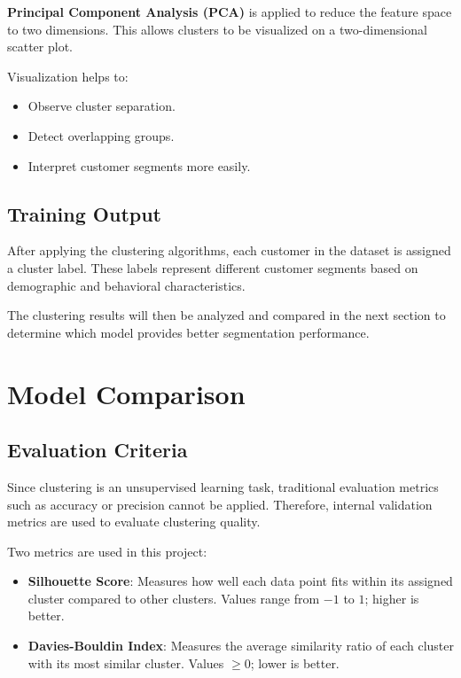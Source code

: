 \documentclass[12pt,a4paper]{article}
\begin{document}
\textbf{Principal Component Analysis (PCA)} is applied to reduce the feature space to two dimensions. This allows clusters to be visualized on a two-dimensional scatter plot.

Visualization helps to:

\begin{itemize}
    \item Observe cluster separation.
    \item Detect overlapping groups.
    \item Interpret customer segments more easily.
\end{itemize}

\subsection{Training Output}

After applying the clustering algorithms, each customer in the dataset is assigned a cluster label. These labels represent different customer segments based on demographic and behavioral characteristics.

The clustering results will then be analyzed and compared in the next section to determine which model provides better segmentation performance.


\section{Model Comparison}

\subsection{Evaluation Criteria}

Since clustering is an unsupervised learning task, traditional evaluation metrics such as accuracy or precision cannot be applied. Therefore, internal validation metrics are used to evaluate clustering quality.

Two metrics are used in this project:

\begin{itemize}
    \item \textbf{Silhouette Score}: Measures how well each data point fits within its assigned cluster compared to other clusters. Values range from $-1$ to $1$; higher is better.
    \item \textbf{Davies-Bouldin Index}: Measures the average similarity ratio of each cluster with its most similar cluster. Values $\geq 0$; lower is better.
\end{itemize}
\end{document}

